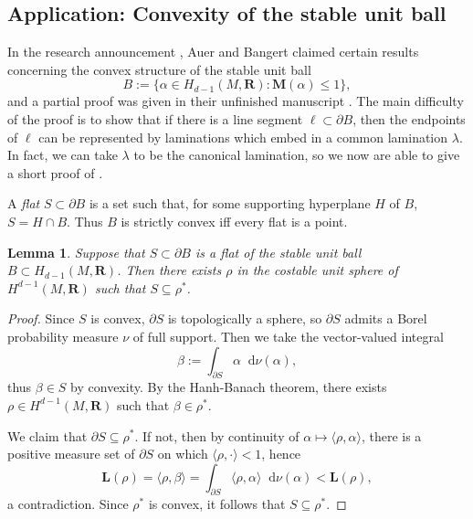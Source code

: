 \documentclass[reqno,11pt]{amsart}
\newcommand{\RR}{\mathbf{R}}
\newcommand*\dif{\mathop{}\!\mathrm{d}}
\newcommand{\Mass}{\mathbf M}
\newcommand{\Comass}{\mathbf L}
\newcommand{\dfn}[1]{\emph{#1}\index{#1}}
\newtheorem{lemma}[theorem]{Lemma}
\theoremstyle{definition}
\numberwithin{equation}{section}
\begin{document}

\subsection{Application: Convexity of the stable unit ball}\label{convexity sec}
In the research announcement \cite{Auer01}, Auer and Bangert claimed certain results concerning the convex structure of the stable unit ball
$$B := \{\alpha \in H_{d - 1}(M, \RR): \Mass(\alpha) \leq 1\},$$
and a partial proof was given in their unfinished manuscript \cite{Auer12}.
The main difficulty of the proof is to show that if there is a line segment $\ell \subset \partial B$, then the endpoints of $\ell$ can be represented by laminations which embed in a common lamination $\lambda$.
In fact, we can take $\lambda$ to be the canonical lamination, so we now are able to give a short proof of \cite[Theorems 6 and 7]{Auer01}.

A \dfn{flat} $S \subset \partial B$ is a set such that, for some supporting hyperplane $H$ of $B$, $S = H \cap B$.
Thus $B$ is strictly convex iff every flat is a point.

\begin{lemma} \label{flats have dual classes}
Suppose that $S \subset \partial B$ is a flat of the stable unit ball $B \subset H_{d - 1}(M, \RR)$.
Then there exists $\rho$ in the costable unit sphere of $H^{d - 1}(M, \RR)$ such that $S \subseteq \rho^*$.
\end{lemma}
\begin{proof}
Since $S$ is convex, $\partial S$ is topologically a sphere, so $\partial S$ admits a Borel probability measure $\nu$ of full support.
Then we take the vector-valued integral 
$$\beta := \int_{\partial S} \alpha \dif \nu(\alpha),$$
thus $\beta \in S$ by convexity.
By the Hanh-Banach theorem, there exists $\rho \in H^{d - 1}(M, \RR)$ such that $\beta \in \rho^*$.

We claim that $\partial S \subseteq \rho^*$.
If not, then by continuity of $\alpha \mapsto \langle \rho, \alpha\rangle$, there is a positive measure set of $\partial S$ on which $\langle \rho, \cdot\rangle < 1$, hence
$$\Comass(\rho) = \langle \rho, \beta\rangle = \int_{\partial S} \langle \rho, \alpha\rangle \dif \nu(\alpha) < \Comass(\rho),$$
a contradiction.
Since $\rho^*$ is convex, it follows that $S \subseteq \rho^*$.
\end{proof}
\end{document}
